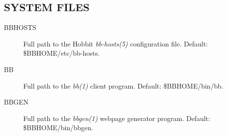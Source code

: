 \subsection{SYSTEM FILES}


 \begin{description}
\item[BBHOSTS] Full path to the Hobbit \emph{bb-hosts(5)}
 configuration file. Default: \$BBHOME/etc/bb-hosts. 

 

\item[BB] Full path to the \emph{bb(1)}
 client program. Default: \$BBHOME/bin/bb. 

 

\item[BBGEN] Full path to the \emph{bbgen(1)}
 webpage generator program. Default: \$BBHOME/bin/bbgen. 

 


 


\end{description}

